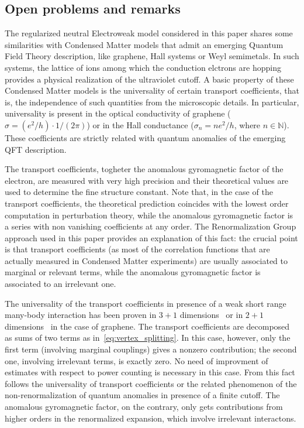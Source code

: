 \documentclass[a4paper, 11pt]{article}
\newcommand{\N}{\mathbb{N}}
\theoremstyle{thm}
\begin{document}
\subsection{Open problems and remarks}

The regularized neutral Electroweak model considered in this paper shares some similarities with Condensed Matter models that admit an emerging Quantum Field Theory description, like graphene, Hall systems or Weyl semimetals. In such systems, the lattice of ions among which the conduction elctrons are hopping provides a physical realization of the ultraviolet cutoff. A basic property of these Condensed Matter models is the universality of certain transport coefficients, that is, the independence of such quantities from the microscopic details. In particular, universality is present in the optical conductivity of graphene ($\sigma=(e^2/h) \cdot 1/(2\pi)$) or in the Hall conductance ($\sigma_n = n e^2/h$, where $n \in \N$). These coefficients are strictly related with quantum anomalies of the emerging QFT description.

The transport coefficients, togheter the anomalous gyromagnetic factor of the electron, are measured with very high precision and their theoretical values are used to determine the fine structure constant. Note that, in the case of the transport coefficients, the theoretical prediction coincides with the lowest order computation in perturbation theory, while the anomalous gyromagnetic factor is a series with non vanishing coefficients at any order. The Renormalization Group approach used in this paper provides an explanation of this fact: the crucial point is that transport coefficients (as most of the correlation functions that are actually measured in Condensed Matter experiments) are usually associated to marginal or relevant terms, while the anomalous gyromagnetic factor is associated to an irrelevant one.

The universality of the transport coefficients in presence of a weak short range many-body interaction has been proven in $3+1$ dimensions~\cite{Mastropietro_2007, Giuliani_Mastropietro_Porta_2019, Mastropietro_2024_Vanishing} or in $2+1$ dimensions~\cite{Giuliani_Mastropietro_Porta_2019, Giuliani_Mastropietro_Porta_2017} in the case of graphene. The transport coefficients are decomposed as sums of two terms as in~\eqref{eq:vertex_splitting}. In this case, however, only the first term (involving marginal couplings) gives a nonzero contribution; the second one, involving irrelevant terms, is exactly zero. No need of improvment of estimates with respect to power counting is necessary in this case.
From this fact follows the universality of transport coefficients or the related phenomenon of the non-renormalization of quantum anomalies in presence of a finite cutoff. 
The anomalous gyromagnetic factor, on the contrary, only gets contributions from higher orders in the renormalized expansion, which involve irrelevant interactons. 
\end{document}
